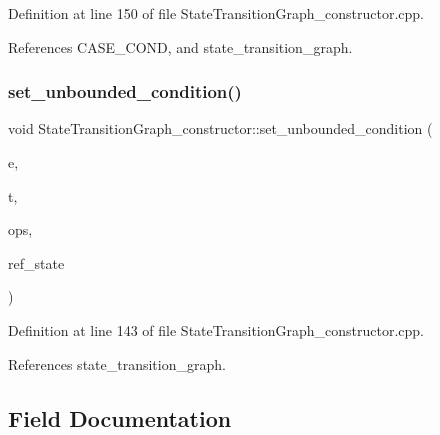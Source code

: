 Definition at line 150 of file State\+Transition\+Graph\+\_\+constructor.\+cpp.



References C\+A\+S\+E\+\_\+\+C\+O\+ND, and state\+\_\+transition\+\_\+graph.

\mbox{\label{classStateTransitionGraph__constructor_ad3423413ff2907841528859244909c55}} 
\subsubsection{\texorpdfstring{set\+\_\+unbounded\+\_\+condition()}{set\_unbounded\_condition()}}
{\footnotesize\ttfamily void State\+Transition\+Graph\+\_\+constructor\+::set\+\_\+unbounded\+\_\+condition (\begin{DoxyParamCaption}\item[{const \hyperlink{graph_8hpp_a9eb9afea34e09f484b21f2efd263dd48}{Edge\+Descriptor} \&}]{e,  }\item[{\hyperlink{state__transition__graph_8hpp_a73ce4c522d9c8d45a7e1ab48c95a1710}{transition\+\_\+type}}]{t,  }\item[{const \hyperlink{classCustomOrderedSet}{Custom\+Ordered\+Set}$<$ \hyperlink{graph_8hpp_abefdcf0544e601805af44eca032cca14}{vertex} $>$ \&}]{ops,  }\item[{\hyperlink{graph_8hpp_abefdcf0544e601805af44eca032cca14}{vertex}}]{ref\+\_\+state }\end{DoxyParamCaption})}



Definition at line 143 of file State\+Transition\+Graph\+\_\+constructor.\+cpp.



References state\+\_\+transition\+\_\+graph.



\subsection{Field Documentation}
\mbox{\label{classStateTransitionGraph__constructor_a6468cf200b8eb5aea034ce1d7b9fbb61}} 
